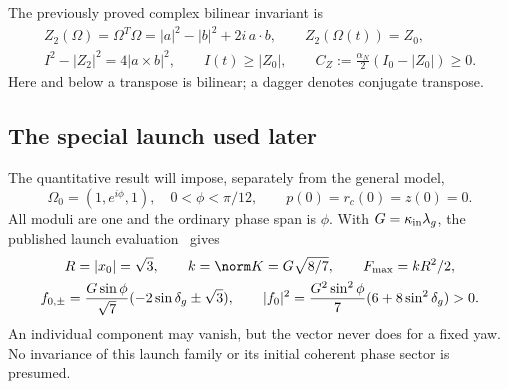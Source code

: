 The previously proved complex bilinear invariant is~\cite[Theorem 5.1]{p1}
\begin{equation}\label{eq:oldinvariant}%
\begin{gathered}
Z_2(\Omega)=\Omega^T\Omega=|a|^2-|b|^2+2i\,a\cdot b,\qquad
Z_2(\Omega(t))=Z_0,\\
I^2-|Z_2|^2=4|a\times b|^2,\qquad I(t)\ge|Z_0|,\qquad
C_Z:=\frac{\alpha_N}{2}(I_0-|Z_0|)\ge0.
\end{gathered}
\end{equation}
Here and below a transpose is bilinear; a dagger denotes conjugate transpose.

\subsection{The special launch used later}
The quantitative result will impose, separately from the general model,
\begin{equation}\label{eq:launch}%
\Omega_0=(1,e^{i\phi},1),\quad 0<\phi<\pi/12,\qquad
p(0)=r_c(0)=z(0)=0.
\end{equation}
All moduli are one and the ordinary phase span is $\phi$. With $G=\kappa_{\rm in}\lambda_g$, the published launch evaluation~\cite[Section 2.3, (2.12)--(2.13)]{p2} gives
\begin{equation}\label{eq:drive0}%
\begin{gathered}
R=|x_0|=\sqrt3,\qquad k=\norm K=G\sqrt{8/7},\qquad F_{\max}=kR^2/2,\\
f_{0,\pm}=\frac{G\sin\phi}{\sqrt7}(-2\sin\delta_g\pm\sqrt3),\qquad
|f_0|^2=\frac{G^2\sin^2\phi}{7}(6+8\sin^2\delta_g)>0 .
\end{gathered}
\end{equation}
An individual component may vanish, but the vector never does for a fixed yaw. No invariance of this launch family or its initial coherent phase sector is presumed.
